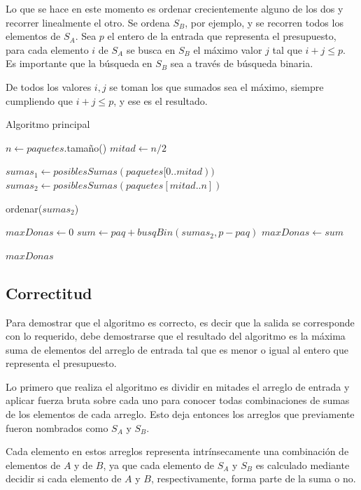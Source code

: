 Lo que se hace en este momento es ordenar crecientemente alguno de los dos y
recorrer linealmente el otro. Se ordena $S_B$, por ejemplo, y se recorren todos
los elementos de $S_A$. Sea $p$ el entero de la entrada que representa el
presupuesto, para cada elemento $i$ de $S_A$ se busca en $S_B$ el máximo valor
$j$ tal que $i + j \leq p$. Es importante que la búsqueda en $S_B$ sea a través
de búsqueda binaria.

De todos los valores $i,j$ se toman los que sumados sea el máximo, siempre
cumpliendo que $i + j \leq p$, y ese es el resultado.

\bigskip

\begin{algorithm}[H]
	\caption{Algoritmo principal}
    $n \gets paquetes$.tamaño() \;
	$mitad \gets n / 2$ \;

	$sumas_1 \gets posiblesSumas(paquetes[0..mitad))$ \;
	$sumas_2 \gets posiblesSumas(paquetes[mitad..n])$ \;

	ordenar($sumas_2$) \;

	$maxDonas \gets 0$ \;
	 {
		 {
			$sum \gets paq + busqBin(sumas_2, p - paq)$ \;
			 {
				$maxDonas \gets sum$ \;
			}
		}
	}

	\Return $maxDonas$ \;
\end{algorithm}

\subsection{Correctitud}

Para demostrar que el algoritmo es correcto, es decir que la salida se
corresponde con lo requerido, debe demostrarse que el resultado del algoritmo es
la máxima suma de elementos del arreglo de entrada tal que es menor o igual al
entero que representa el presupuesto.

Lo primero que realiza el algoritmo es dividir en mitades el arreglo de entrada
y aplicar fuerza bruta sobre cada uno para conocer todas combinaciones de sumas
de los elementos de cada arreglo. Esto deja entonces los arreglos que
previamente fueron nombrados como $S_A$ y $S_B$.

Cada elemento en estos arreglos representa intrínsecamente una combinación de
elementos de $A$ y de $B$, ya que cada elemento de $S_A$ y $S_B$ es calculado
mediante decidir si cada elemento de $A$ y $B$, respectivamente, forma parte de
la suma o no.


